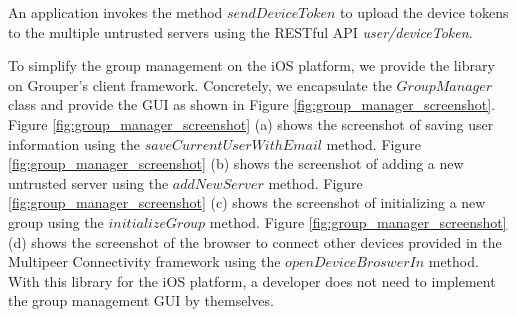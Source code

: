 \documentclass[a4paper,11pt]{report}
\begin{document}
An application invokes the method $sendDeviceToken$ to upload the device tokens to the multiple untrusted servers using the RESTful API \emph{user/deviceToken}.

To simplify the group management on the iOS platform, we provide the library on Grouper's client framework.
Concretely, we encapsulate the $GroupManager$ class and provide the GUI as shown in Figure \ref{fig:group_manager_screenshot}.
Figure \ref{fig:group_manager_screenshot} (a) shows the screenshot of saving user information using the  $saveCurrentUserWithEmail$ method.
Figure \ref{fig:group_manager_screenshot} (b) shows the screenshot of adding a new untrusted server using the  $addNewServer$ method.
Figure \ref{fig:group_manager_screenshot} (c) shows the screenshot of initializing a new group using the  $initializeGroup$ method.
Figure \ref{fig:group_manager_screenshot} (d) shows the screenshot of the browser to connect other devices provided in the Multipeer Connectivity framework using the $openDeviceBroswerIn$ method.
With this library for the iOS platform, a developer does not need to implement the group management GUI by themselves.
\end{document}
